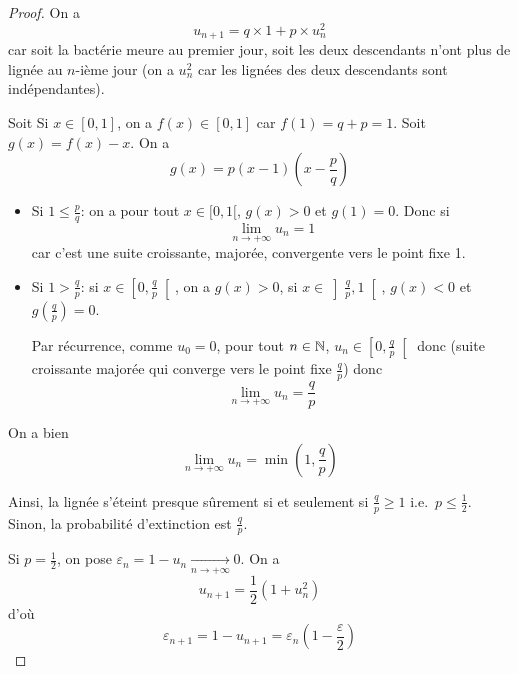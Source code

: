 \documentclass[12pt]{article}
\begin{document}
\begin{proof}
    On a 
    \begin{equation}
        u_{n+1}=q\times 1+p\times u_{n}^{2}
    \end{equation}
    car soit la bactérie meure au premier jour, soit les deux descendants n'ont plus de lignée au $n$-ième jour (on a $u_{n}^{2}$ car les lignées des deux descendants sont indépendantes).

    Soit 
    Si $x\in[0,1]$, on a $f(x)\in[0,1]$ car $f(1)=q+p=1$. Soit $g(x)=f(x)-x$. On a 
    \begin{equation}
        g(x)=p\left(x-1\right)\left(x-\frac{p}{q}\right)
    \end{equation}
    \begin{itemize}
        \item Si $1\leqslant\frac{p}{q}$: on a pour tout $x\in[0,1[$, $g(x)>0$ et $g(1)=0$. Donc si 
        \begin{equation}
            \boxed{\lim\limits_{n\to+\infty}u_{n}=1}
        \end{equation}
        car c'est une suite croissante, majorée, convergente vers le point fixe 1.

        \item Si $1>\frac{q}{p}$: si $x\in\left[0,\frac{q}{p}\right[$, on a $g(x)>0$, si $x\in\left]\frac{q}{p},1\right[$, $g(x)<0$ et $g\left(\frac{q}{p}\right)=0$.
        
        Par récurrence, comme $u_{0}=0$, pour tout $n\in\mathbb{N}$, $u_{n}\in\left[0,\frac{q}{p}\right[$ donc (suite croissante majorée qui converge vers le point fixe $\frac{q}{p}$) donc 
        \begin{equation}
            \boxed{\lim\limits_{n\to+\infty}u_{n}=\frac{q}{p}}
        \end{equation}
    \end{itemize}

    On a bien 
    \begin{equation}
        \boxed{\lim\limits_{n\to+\infty}u_{n}=\min\left(1,\frac{q}{p}\right)}
    \end{equation}

    Ainsi, la lignée s'éteint presque sûrement si et seulement si $\frac{q}{p}\geqslant1$ i.e.~$p\leqslant\frac{1}{2}$. Sinon, la probabilité d'extinction est $\frac{q}{p}$.

    Si $p=\frac{1}{2}$, on pose $\varepsilon_{n}=1-u_{n}\xrightarrow[n\to+\infty]{}0$. On a 
    \begin{equation}
        u_{n+1}=\frac{1}{2}\left(1+u_{n}^{2}\right)
    \end{equation}
    d'où 
    \begin{equation}
        \varepsilon_{n+1}=1-u_{n+1}=\varepsilon_{n}\left(1-\frac{\varepsilon}{2}\right)
    \end{equation}


\end{proof}
\end{document}
